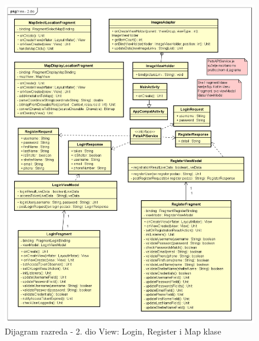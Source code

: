 			\begin{figure}[H]
				\includegraphics[scale=0.48]{dijagrami/dijagramiRazreda/View2.PNG} %
				\centering
				\caption{Dijagram razreda - 2. dio View: Login, Register i Map klase}
				\label{fig:drView2}
			\end{figure}

